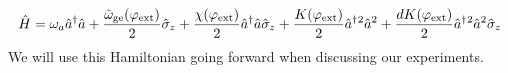 \begin{equation}
    \hat{H} = \omega_a \hat{a}^\dagger\hat{a} + \frac{\tilde{\omega}_{\rm ge}(\varphi_{\rm ext})}{2} \hat{\sigma}_z + \frac{\chi(\varphi_{\rm ext})}{2}\hat{a}^\dagger\hat{a}\hat{\sigma}_z  + \frac{K(\varphi_{\rm ext})}{2}\hat{a}^\dagger{}^2\hat{a}^2 + \frac{dK(\varphi_{\rm ext})}{2}\hat{a}^\dagger{}^2\hat{a}^2\hat{\sigma}_z
\end{equation}
We will use this Hamiltonian going forward when discussing our experiments. 